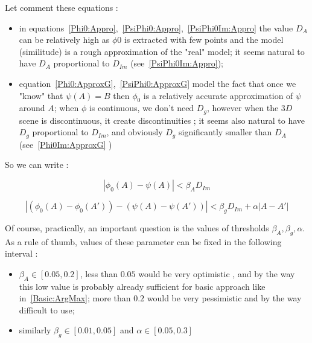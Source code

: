 Let comment these equations  :

\begin{itemize}
   \item in equations~\ref{Phi0:Appro},~\ref{PsiPhi0:Appro},~\ref{PsiPhi0Im:Appro} the value 
         $D_A$ can be relatively high as $\phi0$
         is extracted with few points and the model (similitude) is a rough approximation
         of the "real" model; it seems natural to have $D_A$ proportional to  $D_{Im}$
        (see~\ref{PsiPhi0Im:Appro});

   \item equation~\ref{Phi0:ApproxG},~\ref{PsiPhi0:ApproxG} model the fact that once 
         we "know" that  $ \psi(A)=B$ then $\phi_0$ is a relatively accurate approximation
         of $\psi$ around $A$;  when  $\phi$  is continuous, we don't need $D_g$, however
         when the $3D$ scene is discontinuous, it create discontinuities ; 
         it seems also natural to have $D_g$ proportional to  $D_{Im}$, and obviously
         $D_g$ significantly smaller than $D_A$ (see~\ref{Phi0Im:ApproxG} )
\end{itemize}

So we can write :


\begin{equation}
     | \phi_0(A)  - \psi(A) |  < \beta_A D_{Im}  \label{PsiPhi0Im:Appro}
\end{equation}

\begin{equation}
     | (\phi_0(A) - \phi_0(A')) -(\psi(A) - \psi(A')) |  < \beta_g D_{Im} +  \alpha |A-A'|  \label{Phi0Im:ApproxG}
\end{equation}

Of course, practically, an important question is the values of thresholds $\beta_A, \beta_g, \alpha $.
As a rule of thumb, values of these parameter can be fixed in the following interval :

\begin{itemize}
   \item  $\beta_A \in [0.05,0.2]$, less than $0.05$ would be very optimistic , and by the way this low
          value is probably already sufficient for basic approach like in~\ref{Basic:ArgMax};
          more than $0.2$ would be very pessimistic and by the way difficult to use;

   \item  similarly $\beta_g \in [0.01,0.05]$ and $\alpha \in [0.05,0.3]$
\end{itemize}



